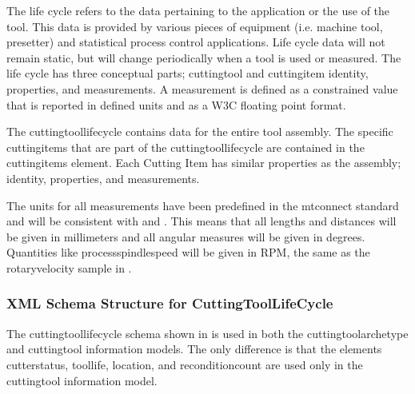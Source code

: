 The life cycle refers to the data pertaining to the application or the use of the tool.  This data is provided by various pieces of equipment (i.e. machine tool, presetter) and statistical process control applications.  Life cycle data will not remain static, but will change periodically when a tool is used or measured.  The life cycle has three conceptual parts; \gls{cuttingtool} and \gls{cuttingitem} identity, properties, and measurements.  A measurement is defined as a constrained value that is reported in defined units and as a W3C floating point format.

The \gls{cuttingtoollifecycle} contains data for the entire tool assembly.  The specific \glspl{cuttingitem} that are part of the \gls{cuttingtoollifecycle} are contained in the \glspl{cuttingitem} element.  Each Cutting Item has similar properties as the assembly; identity, properties, and \glspl{measurement}.

The units for all \glspl{measurement} have been predefined in the \gls{mtconnect standard} and will be consistent with  and .  This means that all lengths and distances will be given in millimeters and all angular measures will be given in degrees.  Quantities like \gls{processspindlespeed} will be given in RPM, the same as the \gls{rotaryvelocity sample} in .

\subsubsection{XML Schema Structure for CuttingToolLifeCycle}

The \gls{cuttingtoollifecycle} schema shown in  is used in both the \gls{cuttingtoolarchetype} and \gls{cuttingtool} \glspl{information model}.  The only difference is that the elements \gls{cutterstatus}, \gls{toollife}, \gls{location}, and \gls{reconditioncount} are used only in the \gls{cuttingtool} \gls{information model}.

